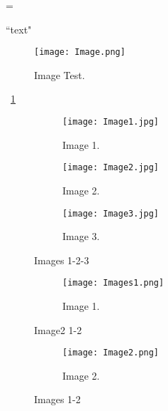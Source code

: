 
\emergencystretch=\maxdimen


``text"


\begin{figure}[h!]
	\centering
	\texttt{[image: Image.png]}
	\caption{Image Test.}
	\label{fig:image_test}
\end{figure}


\figurename{~\ref{fig:image_test}}


\begin{figure}[h]
	\centering
	\begin{subfigure}{1\textwidth}
	\texttt{[image: Image1.jpg]}
	\caption{Image 1.}
	\label{fig:image1}
	\end{subfigure}
	\begin{subfigure}{1\textwidth}
		\texttt{[image: Image2.jpg]}
		\caption{Image 2.}
		\label{fig:image2}
	\end{subfigure}
	\begin{subfigure}{1\textwidth}
		\texttt{[image: Image3.jpg]}
		\caption{Image 3.}
		\label{fig:image3}
	\end{subfigure}
	\caption{Images 1-2-3}
\end{figure}


\usepackage[export]{adjustbox}


\begin{figure}[h]
	\centering
	\begin{subfigure}[b]{0.5\textwidth}
		\texttt{[image: Images1.png]}
		\caption{Image 1.}
		\label{fig:image1}
	\end{subfigure}
	\caption{Image2 1-2}
\end{figure}
\begin{figure}\ContinuedFloat[h]
	\centering
	\begin{subfigure}[b]{0.5\textwidth}
		\texttt{[image: Image2.png]}
		\caption{Image 2.}
		\label{fig:image2}
	\end{subfigure}
	\caption{Images 1-2}
\end{figure}


\usepackage{hyperref}

